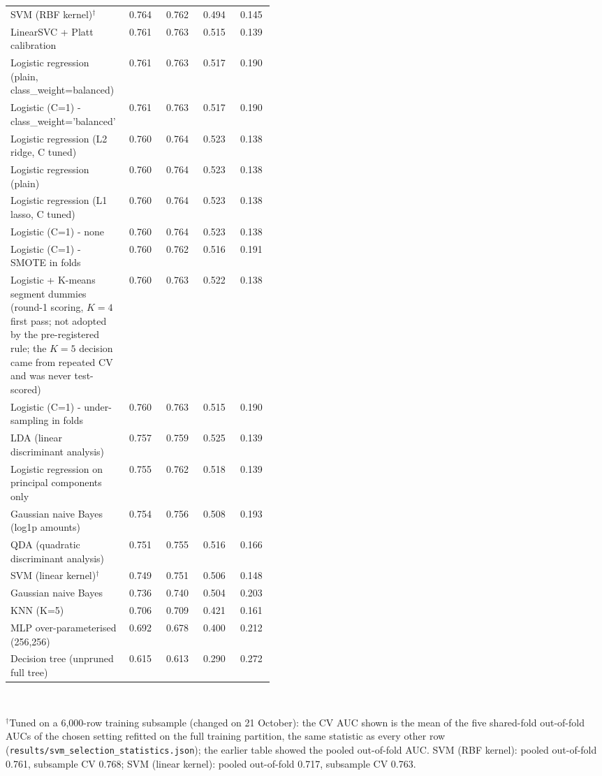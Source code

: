 \begin{table}[!htbp]
\begin{tabular}{@{}L{0.44\linewidth}cccc@{}}
    SVM (RBF kernel)$^{\dagger}$ & 0.764 & 0.762 & 0.494 & 0.145 \\
    LinearSVC + Platt calibration & 0.761 & 0.763 & 0.515 & 0.139 \\
    Logistic regression (plain, class\_weight=balanced) & 0.761 & 0.763 & 0.517 & 0.190 \\
    Logistic (C=1) - class\_weight='balanced' & 0.761 & 0.763 & 0.517 & 0.190 \\
    Logistic regression (L2 ridge, C tuned) & 0.760 & 0.764 & 0.523 & 0.138 \\
    Logistic regression (plain) & 0.760 & 0.764 & 0.523 & 0.138 \\
    Logistic regression (L1 lasso, C tuned) & 0.760 & 0.764 & 0.523 & 0.138 \\
    Logistic (C=1) - none & 0.760 & 0.764 & 0.523 & 0.138 \\
    Logistic (C=1) - SMOTE in folds & 0.760 & 0.762 & 0.516 & 0.191 \\
    Logistic + K-means segment dummies (round-1 scoring, $K = 4$ first pass; not adopted by the pre-registered rule; the $K = 5$ decision came from repeated CV and was never test-scored) & 0.760 & 0.763 & 0.522 & 0.138 \\
    Logistic (C=1) - under-sampling in folds & 0.760 & 0.763 & 0.515 & 0.190 \\
    LDA (linear discriminant analysis) & 0.757 & 0.759 & 0.525 & 0.139 \\
    Logistic regression on principal components only & 0.755 & 0.762 & 0.518 & 0.139 \\
    Gaussian naive Bayes (log1p amounts) & 0.754 & 0.756 & 0.508 & 0.193 \\
    QDA (quadratic discriminant analysis) & 0.751 & 0.755 & 0.516 & 0.166 \\
    SVM (linear kernel)$^{\dagger}$ & 0.749 & 0.751 & 0.506 & 0.148 \\
    Gaussian naive Bayes & 0.736 & 0.740 & 0.504 & 0.203 \\
    KNN (K=5) & 0.706 & 0.709 & 0.421 & 0.161 \\
    MLP over-parameterised (256,256) & 0.692 & 0.678 & 0.400 & 0.212 \\
    Decision tree (unpruned full tree) & 0.615 & 0.613 & 0.290 & 0.272 \\
    \bottomrule
  \end{tabular}
  \\[3pt]\begin{minipage}{\linewidth}\footnotesize $^{\dagger}$Tuned on a 6,000-row training subsample (changed on 21 October): the CV AUC shown is the mean of the five shared-fold out-of-fold AUCs of the chosen setting refitted on the full training partition, the same statistic as every other row (\texttt{results/svm\_selection\_statistics.json}); the earlier table showed the pooled out-of-fold AUC. SVM (RBF kernel): pooled out-of-fold 0.761, subsample CV 0.768; SVM (linear kernel): pooled out-of-fold 0.717, subsample CV 0.763.\end{minipage}
\end{table}

